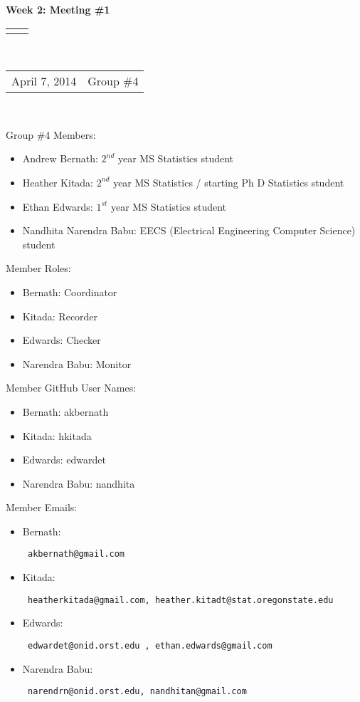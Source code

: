 \documentclass[12pt]{article}
\renewcommand{\title}[1]{\textbf{#1}\\}
\renewcommand{\line}{\begin{tabularx}{\textwidth}{X>{\raggedleft}X}\hline\\\end{tabularx}\\[-0.5cm]}
\newcommand{\leftright}[2]{\begin{tabularx}{\textwidth}{X>{\raggedleft}X}#1%
& #2\\\end{tabularx}\\[-0.5cm]}
\begin{document}
\title{Week 2: Meeting \#1 }
\line
\leftright{April 7, 2014}{Group \#4} %
\vspace{5mm}

Group \#4 Members: 
\begin{itemize}
\item Andrew Bernath: $2^{nd}$ year MS Statistics student
\item Heather Kitada: $2^{nd}$ year MS Statistics / starting Ph D Statistics student
\item Ethan Edwards: $1^{st}$ year MS Statistics student
\item Nandhita Narendra Babu: EECS (Electrical Engineering Computer Science) student
\end{itemize}

Member Roles: 
\begin{itemize}
\item Bernath: Coordinator 
\item Kitada: Recorder
\item Edwards: Checker
\item Narendra Babu: Monitor 
\end{itemize}

Member GitHub User Names:  
\begin{itemize}
\item Bernath: akbernath
\item Kitada: hkitada
\item Edwards: edwardet
\item Narendra Babu: nandhita
\end{itemize}

Member Emails: 
\begin{itemize}
\item Bernath: \begin{verbatim} akbernath@gmail.com \end{verbatim}
\item Kitada: \begin{verbatim} heatherkitada@gmail.com, heather.kitadt@stat.oregonstate.edu \end{verbatim}
\item Edwards: \begin{verbatim} edwardet@onid.orst.edu , ethan.edwards@gmail.com\end{verbatim}
\item Narendra Babu: \begin{verbatim} narendrn@onid.orst.edu, nandhitan@gmail.com \end{verbatim}
\end{itemize}
\end{document}
